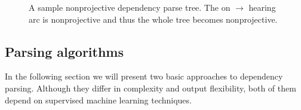 \begin{figure}[!htbp]
  \centering
  \caption{A sample nonprojective dependency parse tree. The on $\rightarrow$ hearing arc is
    nonprojective and thus the whole tree becomes nonprojective.}
  \label{fig:dependency_nonproj}
\end{figure}

\subsection{Parsing algorithms}
In the following section we will present two basic approaches to dependency parsing.
Although they differ in complexity and output flexibility, both of them depend
on supervised machine learning techniques.

